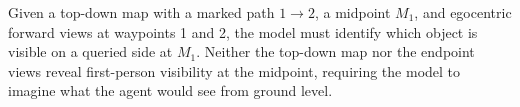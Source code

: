 


Given a top-down map with a marked path $1\!\rightarrow\!2$, a midpoint $M_1$, and egocentric forward views at waypoints 1 and 2, the model must identify which object is visible on a queried side at $M_1$. Neither the top-down map nor the endpoint views reveal first-person visibility at the midpoint, requiring the model to imagine what the agent would see from ground level.


